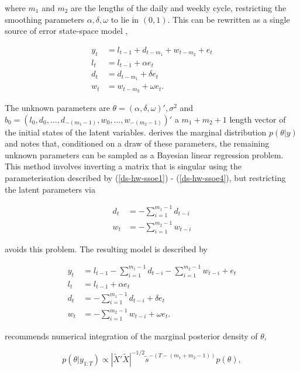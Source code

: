\documentclass[12pt,a4paper]{article}%
\numberwithin{equation}{section}
\begin{document}
where $m_1$ and $m_2$ are the lengths of the daily and weekly cycle, restricting the smoothing parameters $\alpha, \delta, \omega$ to lie in $(0, 1)$. This can be rewritten as a single source of error state-space model \citep{Snyder1985},

\begin{align}
y_t &= l_{t-1} + d_{t-m_1} + w_{t-m_2} + e_t \label{ds-hw-ssoe1} \\
l_t &= l_{t-1} + \alpha e_t \label{ds-hw-ssoe2} \\
d_t &= d_{t-m_1} + \delta e_t \label{ds-hw-ssoe3} \\
w_t &= w_{t-m_2} + \omega e_t \label{ds-hw-ssoe4}. 
\end{align}

The unknown parameters are $\theta = (\alpha, \delta, \omega)', \sigma^2$ and $b_0 = (l_0, d_0, \dots, d_{-(m_1 - 1)}, w_0, \dots, w_{-(m_2 - 1)})'$ a $m_1 + m_2 + 1$ length vector of the initial states of the latent variables. 
\citet{Forbes2000} derives the marginal distribution $p(\theta | y)$ and notes that, conditioned on a draw of these parameters, the remaining unknown parameters can be sampled as a Bayesian linear regression problem. This method involves inverting a matrix that is singular using the parameterisation described by (\ref{ds-hw-ssoe1}) - (\ref{ds-hw-ssoe4}), but restricting the latent parameters via

\begin{align}
d_t &= - \sum_{i=1}^{m_1-1} d_{t-i} \\
w_t &= - \sum_{i=1}^{m_2-1} w_{t-i}
\end{align}

avoids this problem. The resulting model is described by

\begin{align}
y_t &= l_{t-1} - \sum_{i = 1}^{m_1 - 1}d_{t-i} - \sum_{i = 1}^{m_2 - 1}w_{t-i} + e_t \label{ds-hw-rp1} \\
l_t &= l_{t-1} + \alpha e_t \label{ds-hw-rp2} \\
d_t &= - \sum_{i = 1}^{m_1 - 1}d_{t-i} + \delta e_t \label{ds-hw-rp3} \\
w_t &= - \sum_{i = 1}^{m_2 - 1}w_{t-i} + \omega e_t \label{ds-hw-rp4}.
\end{align}

\citet{Forbes2000} recommends numerical integration of the marginal posterior density of $\theta$,

\begin{equation}
\label{exp-sm-marginal}
p(\theta | y_{1:T}) \propto \left| \widetilde{X}' \widetilde{X} \right|^{-1/2} \tilde{s}^{-(T-(m_1 + m_2 - 1))} p(\theta),
\end{equation}
\end{document}
